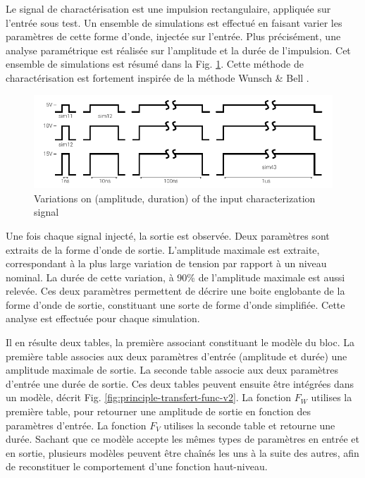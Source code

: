 Le signal de charactérisation est une impulsion rectangulaire, appliquée sur l'entrée sous test.
Un ensemble de simulations est effectué en faisant varier les paramètres de cette forme d'onde, injectée sur l'entrée.
Plus précisément, une analyse paramétrique est réalisée sur l'amplitude et la durée de l'impulsion.
Cet ensemble de simulations est résumé dans la Fig. \ref{set_input_signals}.
Cette méthode de charactérisation est fortement inspirée de la méthode Wunsch & Bell \cite{}.

\begin{figure}[!h]
  \centering
  \includegraphics{src/1/figures/time_domain_cz_curves.pdf}
  \caption{Variations on (amplitude, duration) of the input characterization signal}
  \label{set_input_signals}
\end{figure}

Une fois chaque signal injecté, la sortie est observée.
Deux paramètres sont extraits de la forme d'onde de sortie.
L'amplitude maximale est extraite, correspondant à la plus large variation de tension par rapport à un niveau nominal.
La durée de cette variation, à 90\% de l'amplitude maximale est aussi relevée.
Ces deux paramètres permettent de décrire une boite englobante de la forme d'onde de sortie, constituant une sorte de forme d'onde simplifiée.
Cette analyse est effectuée pour chaque simulation.

Il en résulte deux tables, la première associant constituant le modèle du bloc.
La première table associes aux deux paramètres d'entrée (amplitude et durée) une amplitude maximale de sortie.
La seconde table associe aux deux paramètres d'entrée une durée de sortie.
Ces deux tables peuvent ensuite être intégrées dans un modèle, décrit Fig. \ref{fig:principle-transfert-func-v2}.
La fonction $F_{W}$ utilises la première table, pour retourner une amplitude de sortie en fonction des paramètres d'entrée.
La fonction $F_{V}$ utilises la seconde table et retourne une durée.
Sachant que ce modèle accepte les mêmes types de paramètres en entrée et en sortie, plusieurs modèles peuvent être chaînés les uns à la suite des autres, afin de reconstituer le comportement d'une fonction haut-niveau.

